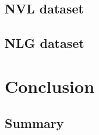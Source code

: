 \documentclass{ieeeojies}
\begin{document}
	\subsection{NVL dataset} 
	
	\subsection{NLG dataset} 
	
	\section{Conclusion}
	\subsection{Summary}
	
\end{document}
